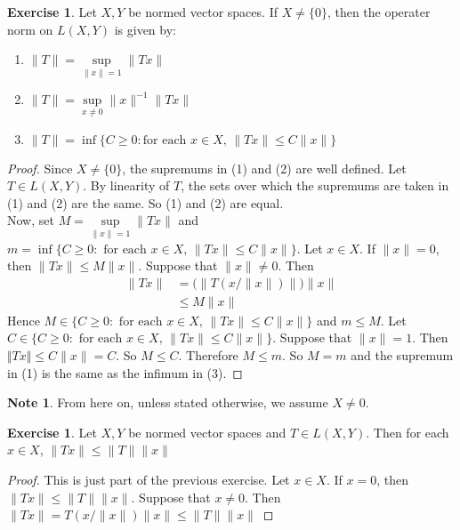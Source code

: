 \documentclass[12pt]{amsart}
\theoremstyle{definition}
\newtheorem{note}[definition]{Note}
\newtheorem{ex}[definition]{Exercise}
\newcommand{\lex}[1]{\label{ex:#1}}
\begin{document}
	\begin{ex} \lex{42006}
		Let $X,Y$ be normed vector spaces. If $X\neq \{0\}$, then the operater norm on $L(X,Y)$ is given by: 
		\begin{enumerate}
			\item $\|T\| = \sup\limits_{\|x\|=1}\|Tx\|$
			\item $\|T\| = \sup\limits_{x \neq 0}\|x\|^{-1} \|Tx\|$
			\item $\|T\| = \inf \{C \geq 0: \text{for each }x \in X\text{, } \|Tx \|\leq C\|x\|\}$
		\end{enumerate}
	\end{ex}
	
	\begin{proof} Since $X \neq \{0\}$, the supremums in (1) and (2) are well defined. Let $T \in L(X,Y)$. By linearity of $T$, the sets over which the supremums are taken in (1) and (2) are the same. So (1) and (2) are equal.\\
		Now, set $M = \sup\limits_{\|x \|=1} \|Tx \|$ and $m = \inf \{C \geq 0: \text{ for each }x \in X\text{, } \|Tx \|\leq C \|x \|\}$. Let $x \in X$. If $\|x \|=0$, then $\|Tx \|\leq M \|x \|$. Suppose that $\|x \|\neq 0$. Then 
		\begin{align*}
			\|Tx \|
			&= \bigg(\big\|T(x/\|x\|)\big\|\bigg)\|x \|\\
			& \leq M \|x\|
		\end{align*}
		Hence $M \in \{C \geq 0: \text{ for each }x \in X\text{, } \|Tx \|\leq C \|x \|\}$ and $m \leq M$.
		Let $C \in \{C \geq 0: \text{ for each }x \in X\text{, } \|Tx \|\leq C \|x\|\}$. Suppose that $\|x \|=1$. Then $\Vert Tx\Vert \leq C \|x \|= C$. So $M \leq C$. Therefore $M \leq m$. So $M=m$ and the supremum in (1) is the same as the infimum in (3). 
	\end{proof}
	
	\begin{note}
		From here on, unless stated otherwise, we assume $X \neq 0$.
	\end{note}
	
	\begin{ex} \lex{42007}
		Let $X,Y$ be normed vector spaces and $T \in L(X,Y)$. Then for each $x \in X$, $\|Tx \| \leq \|T\|\|x \|$
	\end{ex}
	
	\begin{proof}
		This is just part of the previous exercise. Let $x \in X$. If $x = 0$, then $\|Tx \|\leq \|T \|\|x \|$. Suppose that $x \neq 0$. Then $\|Tx \|= T(x/\|x\|)\|x\|\leq \|T \|\|x \|$
	\end{proof}
	
\end{document}
